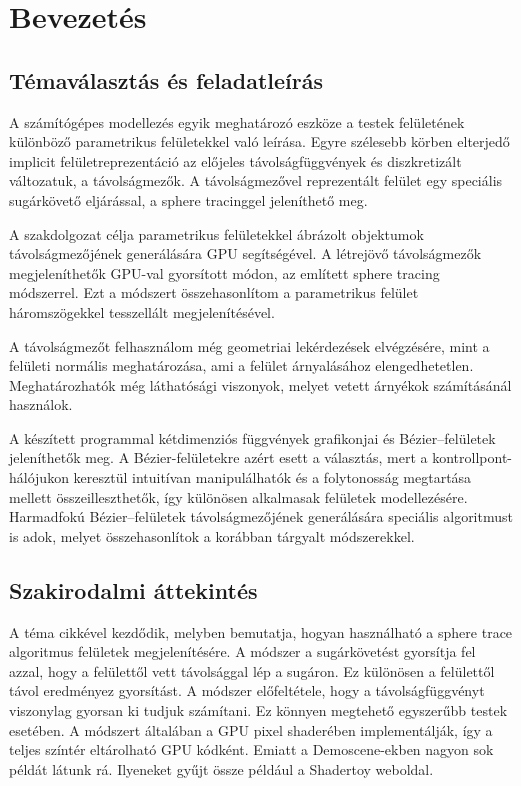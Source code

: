 \chapter{Bevezetés}
\label{ch:intro}

\section{Témaválasztás és feladatleírás}

A számítógépes modellezés egyik meghatározó eszköze a testek felületének különböző parametrikus felületekkel való leírása. Egyre szélesebb körben elterjedő implicit felületreprezentáció az előjeles távolságfüggvények és diszkretizált változatuk, a távolságmezők. A távolságmezővel reprezentált felület egy speciális sugárkövető eljárással, a sphere tracinggel jeleníthető meg.

A szakdolgozat célja parametrikus felületekkel ábrázolt objektumok távolságmezőjének generálására GPU segítségével. A létrejövő távolságmezők megjeleníthetők GPU-val gyorsított módon, az említett sphere tracing módszerrel. Ezt a módszert összehasonlítom a parametrikus felület háromszögekkel tesszellált megjelenítésével.

A távolságmezőt felhasználom még geometriai lekérdezések elvégzésére, mint a felületi normális meghatározása, ami a felület árnyalásához elengedhetetlen. Meghatározhatók még láthatósági viszonyok, melyet vetett árnyékok számításánál használok.

A készített programmal kétdimenziós függvények grafikonjai és Bézier--felületek jeleníthetők meg. A Bézier-felületekre azért esett a választás, mert a kontrollpont-hálójukon keresztül intuitívan manipulálhatók és a folytonosság megtartása mellett összeilleszthetők, így különösen alkalmasak felületek modellezésére. Harmadfokú Bézier--felületek távolságmezőjének generálására speciális algoritmust is adok, melyet összehasonlítok a korábban tárgyalt módszerekkel.

\section{Szakirodalmi áttekintés}

A téma \citeauthor{Hart1996} cikkével \cite{Hart1996} kezdődik, melyben bemutatja, hogyan használható a sphere trace algoritmus felületek megjelenítésére. A módszer a sugárkövetést gyorsítja fel azzal, hogy a felülettől vett távolsággal lép a sugáron. Ez különösen a felülettől távol eredményez gyorsítást. A módszer előfeltétele, hogy a távolságfüggvényt viszonylag gyorsan ki tudjuk számítani. Ez könnyen megtehető egyszerűbb testek esetében. A módszert általában a GPU pixel shaderében implementálják, így a teljes színtér eltárolható GPU kódként. Emiatt a Demoscene-ekben nagyon sok példát látunk rá. Ilyeneket gyűjt össze például a Shadertoy weboldal.

